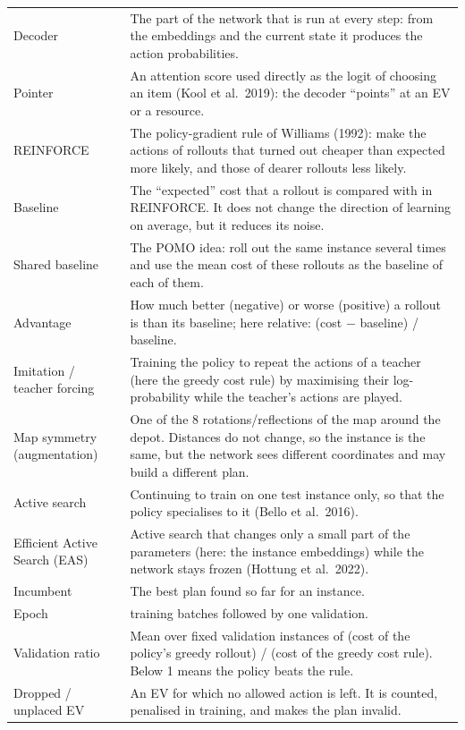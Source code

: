 {\begin{longtable}{@{}>{\raggedright\arraybackslash}p{3.6cm}>{\raggedright\arraybackslash}p{12.4cm}@{}}
Decoder & The part of the network that is run at every step: from the embeddings and the current state it produces the action probabilities. \\
Pointer & An attention score used directly as the logit of choosing an item (Kool et al.\ 2019): the decoder ``points'' at an EV or a resource. \\
REINFORCE & The policy-gradient rule of Williams (1992): make the actions of rollouts that turned out cheaper than expected more likely, and those of dearer rollouts less likely. \\
Baseline & The ``expected'' cost that a rollout is compared with in REINFORCE. It does not change the direction of learning on average, but it reduces its noise. \\
Shared baseline & The POMO idea: roll out the same instance several times and use the mean cost of these rollouts as the baseline of each of them. \\
Advantage & How much better (negative) or worse (positive) a rollout is than its baseline; here relative: (cost $-$ baseline) / baseline. \\
Imitation / teacher forcing & Training the policy to repeat the actions of a teacher (here the greedy cost rule) by maximising their log-probability while the teacher's actions are played. \\
Map symmetry (augmentation) & One of the 8 rotations/reflections of the map around the depot. Distances do not change, so the instance is the same, but the network sees different coordinates and may build a different plan. \\
Active search & Continuing to train on one test instance only, so that the policy specialises to it (Bello et al.\ 2016). \\
Efficient Active Search (EAS) & Active search that changes only a small part of the parameters (here: the instance embeddings) while the network stays frozen (Hottung et al.\ 2022). \\
Incumbent & The best plan found so far for an instance. \\
Epoch & 50 training batches followed by one validation. \\
Validation ratio & Mean over fixed validation instances of (cost of the policy's greedy rollout) / (cost of the greedy cost rule). Below 1 means the policy beats the rule. \\
Dropped / unplaced EV & An EV for which no allowed action is left. It is counted, penalised in training, and makes the plan invalid. \\
\bottomrule
\end{longtable}}
